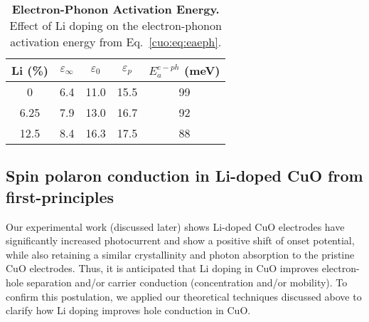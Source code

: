 \begin{table}[H]
    \footnotesize
    \centering
    \begin{tabular}{ccccc}
    \hline \hline
        Li (\%) & $\varepsilon_\infty$ & $\varepsilon_0$ & $\varepsilon_p$ & $E_a^{e-ph}$ (meV) \\
    \hline
    0         & 6.4  & 11.0  & 15.5  & 99 \\
    6.25      & 7.9  & 13.0  & 16.7  & 92 \\
    12.5      & 8.4  & 16.3  & 17.5  & 88 \\
    \hline \hline
    \end{tabular}
    \caption{\textbf{Electron-Phonon Activation Energy.} Effect of Li doping on the electron-phonon activation energy from Eq.~\ref{cuo:eq:eaeph}.}
    \label{cuo:table:eph}
\end{table}

\subsection{Spin polaron conduction in Li-doped CuO from first-principles}
Our experimental work (discussed later) shows Li-doped CuO electrodes have significantly increased photocurrent and show a positive shift of onset potential, while also retaining a similar crystallinity and photon absorption to the pristine CuO electrodes. Thus, it is anticipated that Li doping in CuO improves electron-hole separation and/or carrier conduction (concentration and/or mobility). To confirm this postulation, we applied our theoretical techniques discussed above to clarify how Li doping improves hole conduction in CuO.

